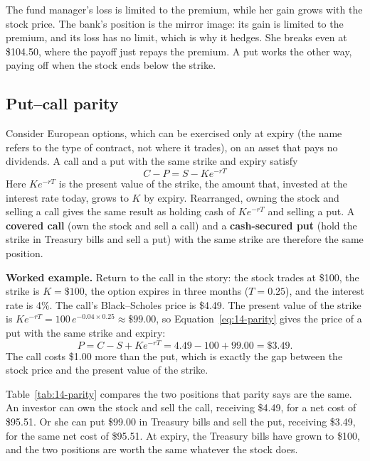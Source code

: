 The fund manager's loss is limited to the premium, while her gain grows with the stock price. The bank's position is the mirror image: its gain is limited to the premium, and its loss has no limit, which is why it hedges. She breaks even at \$104.50, where the payoff just repays the premium. A put works the other way, paying off when the stock ends below the strike.

\subsection{Put--call parity}

Consider European options, which can be exercised only at expiry (the name refers to the type of contract, not where it trades), on an asset that pays no dividends. A call and a put with the same strike and expiry satisfy
\begin{equation}
  C - P = S - K e^{-rT}
  \label{eq:14-parity}
\end{equation}
Here $Ke^{-rT}$ is the present value of the strike, the amount that, invested at the interest rate today, grows to $K$ by expiry. Rearranged, owning the stock and selling a call gives the same result as holding cash of $Ke^{-rT}$ and selling a put. A \textbf{covered call} (own the stock and sell a call) and a \textbf{cash-secured put} (hold the strike in Treasury bills and sell a put) with the same strike are therefore the same position.

\textbf{Worked example.} Return to the call in the story: the stock trades at \$100, the strike is $K = \$100$, the option expires in three months ($T = 0.25$), and the interest rate is 4\%. The call's Black--Scholes price is \$4.49. The present value of the strike is $K e^{-rT} = 100\,e^{-0.04 \times 0.25} \approx \$99.00$, so Equation~\eqref{eq:14-parity} gives the price of a put with the same strike and expiry:
\begin{equation}
  P = C - S + K e^{-rT} = 4.49 - 100 + 99.00 = \$3.49.
  \label{eq:14-parity-example}
\end{equation}
The call costs \$1.00 more than the put, which is exactly the gap between the stock price and the present value of the strike.

Table~\ref{tab:14-parity} compares the two positions that parity says are the same. An investor can own the stock and sell the call, receiving \$4.49, for a net cost of \$95.51. Or she can put \$99.00 in Treasury bills and sell the put, receiving \$3.49, for the same net cost of \$95.51. At expiry, the Treasury bills have grown to \$100, and the two positions are worth the same whatever the stock does.

